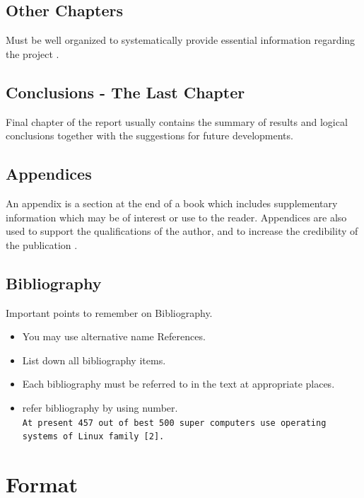 \subsection{Other Chapters}

Must be well organized to systematically provide essential information regarding the project \cite{George1993,Michel1993,Peter1990}.

\subsection{Conclusions - The Last Chapter}

Final chapter of the report usually contains the summary of results and logical conclusions together with the suggestions for future developments.

\subsection{Appendices}

An appendix  is a section at the end of a book which includes supplementary information which may be of interest 
or use to the reader. Appendices are also used to support the qualifications of the author, and to increase the credibility of the publication \cite{Xtreport}.

\subsection{Bibliography}

Important points to remember on Bibliography.\\

\begin{itemize}
   \item You may use alternative name References.
   \item List down all bibliography items.
   \item Each bibliography must be referred to in the text at appropriate places.
   \item refer bibliography by using number. \\
   \texttt{At present 457 out of best 500 super computers use operating systems of Linux family [2]. }
\end{itemize}
 

\section{Format}
 
